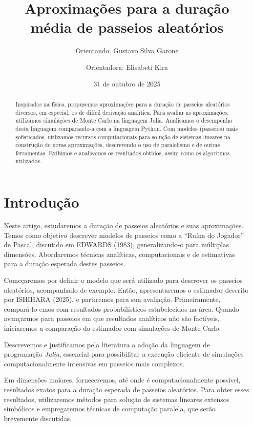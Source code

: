 \documentclass[
  brazilian,
  12pt,
]{article}
\title{Aproximações para a duração média de passeios aleatórios}
\author{Orientando: Gustavo Silva Garone \and Orientadora: Elisabeti
Kira}
\date{31 de outubro de 2025}
\theoremstyle{definition}
\theoremstyle{definition}
\theoremstyle{remark}
\begin{document}
\maketitle
\begin{abstract}
Inspirados na física, propusemos aproximações para a duração de passeios
aleatórios diversos, em especial, os de difícil derivação analítica.
Para avaliar as aproximações, utilizamos simulações de Monte Carlo na
linguagem Julia. Analisamos o desempenho desta linguagem comparando-a
com a linguagem Python. Com modelos (passeios) mais sofisticados,
utilizamos recursos computacionais para solução de sistemas lineares na
construção de novas aproximações, descrevendo o uso de paralelismo e de
outras ferramentas. Exibimos e analisamos os resultados obtidos, assim
como os algoritmos utilizados.
\end{abstract}



\section{Introdução}\label{introduuxe7uxe3o}

Neste artigo, estudaremos a duração de passeios aleatórios e suas
aproximações. Temos como objetivo descrever modelos de passeios como a
``Ruína do Jogador'' de Pascal, discutido em EDWARDS (1983),
generalizando-o para múltiplas dimensões. Abordaremos técnicas
analíticas, computacionais e de estimativas para a duração esperada
destes passeios.

Começaremos por definir o modelo que será utilizado para descrever os
passeios aleatórios, acompanhado de exemplo. Então, apresentaremos o
estimador descrito por ISHIHARA (2025), e partiremos para sua avaliação.
Primeiramente, compará-lo-emos com resultados probabilísticos
estabelecidos na área. Quando avançarmos para passeios em que resultados
analíticos não são factíveis, iniciaremos a comparação do estimador com
simulações de Monte Carlo.

Descrevemos e justificamos pela literatura a adoção da linguagem de
programação \emph{Julia}, essencial para possibilitar a execução
eficiente de simulações computacionalmente intensivas em passeios mais
complexos.

Em dimensões maiores, forneceremos, até onde é computacionalmente
possível, resultados exatos para a duração esperada de passeios
aleatórios. Para obter esses resultados, utilizaremos métodos para
solução de sistemas lineares extensos simbólicos e empregaremos técnicas
de computação paralela, que serão brevemente discutidas.
\end{document}
